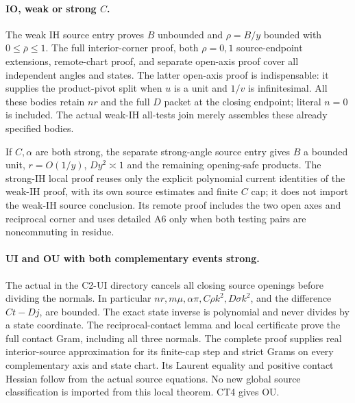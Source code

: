 \paragraph{IO, weak or strong \(C\).}
The weak IH source entry proves \(B\) unbounded and
\(\rho=B/y\) bounded with \(0\leq\bar\rho\leq1\).
The full interior-corner proof, both \(\rho=0,1\) source-endpoint
extensions, remote-chart proof, and separate open-axis proof
cover all independent angles and states.  The latter open-axis
proof is indispensable: it supplies the product-pivot split
when \(u\) is a unit and \(1/v\) is infinitesimal.
All these bodies retain \(nr\) and the full \(D\) packet at the
closing endpoint; literal \(n=0\) is included.
The actual weak-IH all-tests join merely assembles these
already specified bodies.

If \(C,\alpha\) are both strong, the separate strong-angle
source entry gives \(B\) a bounded unit, \(r=O(1/y)\),
\(Dy^2\asymp1\) and the remaining opening-safe products.
The strong-IH local proof reuses only the explicit polynomial
current identities of the weak-IH proof, with its own source
estimates and finite \(C\) cap; it does not import the weak-IH
source conclusion.  Its remote proof includes the two open
axes and reciprocal corner and uses detailed A6 only when
both testing pairs are noncommuting in residue.

\paragraph{UI and OU with both complementary events strong.}
The actual  in the C2-UI
directory cancels all closing source openings before dividing
the normals.  In particular \(nr,m\mu,\alpha\pi,C\rho k^2,
D\sigma k^2\), and the difference \(Ct-Dj\), are bounded.
The exact state inverse is polynomial and never divides by
a state coordinate.  The reciprocal-contact lemma and local
certificate prove the full contact Gram, including all three
normals.  The complete 
proof supplies real interior-source approximation for its
finite-cap step and strict Grams on every complementary
axis and state chart.  Its Laurent equality and positive
contact Hessian follow from the actual source equations.
No new global source classification is imported from this
local theorem.  CT4 gives OU.

